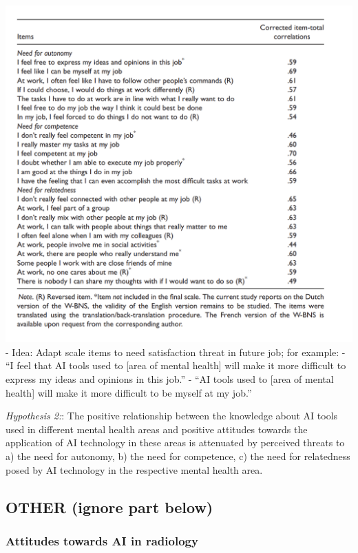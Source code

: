 \documentclass[
  man]{apa7}
\begin{document}
\includegraphics{../figs/need_sat.png}
- Idea: Adapt scale items to need satisfaction threat in future job; for example:
- ``I feel that AI tools used to {[}area of mental health{]} will make it more difficult to express my ideas and opinions in this job.''
- ``AI tools used to {[}area of mental health{]} will make it more difficult to be myself at my job.''

\emph{Hypothesis 2:}: The positive relationship between the knowledge about AI tools used in different mental health areas and positive attitudes towards the application of AI technology in these areas is attenuated by perceived threats to a) the need for autonomy, b) the need for competence, c) the need for relatedness posed by AI technology in the respective mental health area.

\hypertarget{other-ignore-part-below}{%
\subsection{OTHER (ignore part below)}\label{other-ignore-part-below}}

\hypertarget{attitudes-towards-ai-in-radiology}{%
\subsubsection{Attitudes towards AI in radiology}\label{attitudes-towards-ai-in-radiology}}
\end{document}
